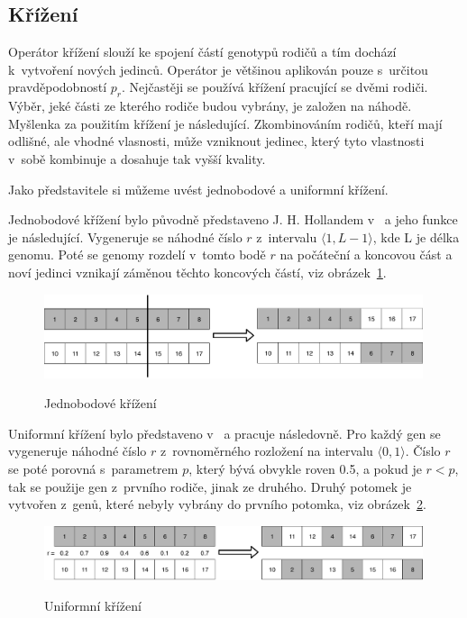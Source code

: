 \subsection{Křížení}
Operátor křížení slouží ke spojení částí genotypů rodičů a tím dochází k~vytvoření nových jedinců.
Operátor je většinou aplikován pouze s~určitou pravděpodobností $p_r$.
Nejčastěji se používá křížení pracující se dvěmi rodiči.
Výběr, jeké části ze kterého rodiče budou vybrány, je založen na náhodě.
Myšlenka za použitím křížení je následující.
Zkombinováním rodičů, kteří mají odlišné, ale vhodné vlasnosti, může vzniknout jedinec, který tyto vlastnosti v~sobě kombinuje a dosahuje tak vyšší kvality.

Jako představitele si můžeme uvést jednobodové a uniformní křížení.

Jednobodové křížení bylo původně představeno J. H. Hollandem v~\cite{Holland1992} a jeho funkce je následující.
Vygeneruje se náhodné číslo $r$ z~intervalu $\langle 1, L-1\rangle$, kde L je délka genomu.
Poté se genomy rozdelí v~tomto bodě $r$ na počáteční a koncovou část a noví jedinci vznikají záměnou těchto koncových částí, viz obrázek~\ref{fig:jednobodove_krizeni}.

\begin{figure}[h]
    \centering
    {\includegraphics[width=30em]{obrazky/jedobodove_krizeni.pdf}}
    \caption{
    Jednobodové křížení
    }
    \label{fig:jednobodove_krizeni}
\end{figure}

Uniformní křížení bylo představeno v~\cite{Syswerda1989} a pracuje následovně.
Pro každý gen se vygeneruje náhodné číslo $r$ z~rovnoměrného rozložení na intervalu $\langle 0, 1\rangle$.
Číslo $r$ se poté porovná s~parametrem $p$, který bývá obvykle roven 0.5, a pokud je $r < p$, tak se použije gen z~prvního rodiče, jinak ze druhého.
Druhý potomek je vytvořen z~genů, které nebyly vybrány do prvního potomka, viz obrázek~\ref{fig:uniformni_krizeni}.

\begin{figure}[h]
    \centering
    {\includegraphics[width=30em]{obrazky/uniformni_krizeni.pdf}}
    \caption{
    Uniformní křížení
    }
    \label{fig:uniformni_krizeni}
\end{figure}


